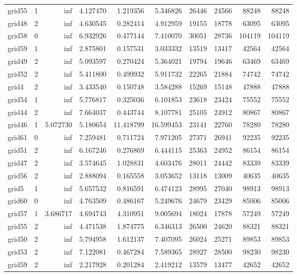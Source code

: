 \begin{longtable}{|l|r|r|r|r|r|r|r|r|r|}
grid55 & 1 & inf & 4.127470 & 1.219356 & 5.346826 & 26446 & 24566 & 88248 & 88248 \\
grid48 & 2 & inf & 4.630545 & 0.282414 & 4.912959 & 19155 & 18778 & 63095 & 63095 \\
grid58 & 0 & inf & 6.932926 & 0.477144 & 7.410070 & 30051 & 28736 & 104119 & 104119 \\
grid59 & 1 & inf & 2.875801 & 0.157531 & 3.033332 & 13519 & 13417 & 42564 & 42564 \\
grid49 & 2 & inf & 5.093597 & 0.270424 & 5.364021 & 19794 & 19646 & 63469 & 63469 \\
grid52 & 2 & inf & 5.411800 & 0.499932 & 5.911732 & 22265 & 21884 & 74742 & 74742 \\
grid4 & 2 & inf & 3.433540 & 0.150748 & 3.584288 & 15269 & 15148 & 47888 & 47888 \\
grid54 & 1 & inf & 5.776817 & 0.325036 & 6.101853 & 23618 & 23424 & 75552 & 75552 \\
grid44 & 2 & inf & 7.664037 & 0.443744 & 8.107781 & 25105 & 24912 & 80867 & 80867 \\
grid46 & 1 & 5.072730 & 5.180654 & 11.418799 & 16.599453 & 23141 & 22760 & 78280 & 78280 \\
grid61 & 0 & inf & 7.259481 & 0.711724 & 7.971205 & 27371 & 26941 & 92235 & 92235 \\
grid51 & 2 & inf & 6.167246 & 0.276869 & 6.444115 & 25363 & 24952 & 86154 & 86154 \\
grid47 & 2 & inf & 3.574645 & 1.028831 & 4.603476 & 28011 & 24442 & 83339 & 83339 \\
grid56 & 2 & inf & 2.888094 & 0.165558 & 3.053652 & 13118 & 13009 & 40635 & 40635 \\
grid5 & 1 & inf & 5.657532 & 0.816591 & 6.474123 & 28995 & 27040 & 98913 & 98913 \\
grid60 & 0 & inf & 4.763509 & 0.486167 & 5.249676 & 24679 & 23429 & 85006 & 85006 \\
grid57 & 1 & 3.686717 & 4.694743 & 4.310951 & 9.005694 & 18024 & 17878 & 57249 & 57249 \\
grid55 & 2 & inf & 4.471538 & 1.874775 & 6.346313 & 26500 & 24620 & 88321 & 88321 \\
grid50 & 2 & inf & 5.794958 & 1.612137 & 7.407095 & 26024 & 25271 & 89853 & 89853 \\
grid53 & 2 & inf & 7.122081 & 0.467284 & 7.589365 & 28927 & 28500 & 98230 & 98230 \\
grid59 & 2 & inf & 2.217928 & 0.201284 & 2.419212 & 13579 & 13477 & 42652 & 42652 \\

\end{longtable}
